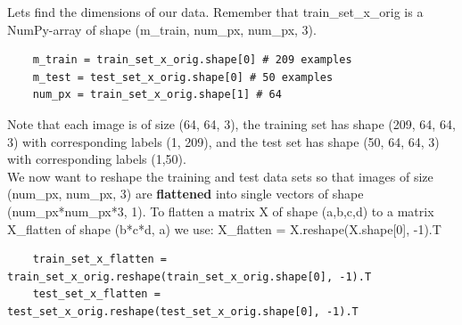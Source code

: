 \documentclass[11pt, a4paper]{article}
\begin{document}
\begin{spacing}{1.1}
	\noindent Lets find the dimensions of our data. Remember that train\_set\_x\_orig is a NumPy-array of shape (m\_train, num\_px, num\_px, 3). 
	\begin{lstlisting}
	m_train = train_set_x_orig.shape[0] # 209 examples
	m_test = test_set_x_orig.shape[0] # 50 examples
	num_px = train_set_x_orig.shape[1] # 64 \end{lstlisting} \vspace*{1mm} 
	Note that each image is of size (64, 64, 3), the training set has shape (209, 64, 64, 3) with corresponding labels (1, 209), and the test set has shape (50, 64, 64, 3) with corresponding labels (1,50). \vspace*{2mm} \\
	We now want to reshape the training and test data sets so that images of size (num\_px, num\_px, 3) are \textbf{flattened} into single vectors of shape (num\_px*num\_px*3, 1). To flatten a matrix X of shape (a,b,c,d) to a matrix X\_flatten of shape (b*c*d, a) we use: X\_flatten = X.reshape(X.shape[0], -1).T
	\begin{lstlisting}
	train_set_x_flatten = train_set_x_orig.reshape(train_set_x_orig.shape[0], -1).T
	test_set_x_flatten = test_set_x_orig.reshape(test_set_x_orig.shape[0], -1).T 
	

\end{lstlisting}
\end{spacing}
\end{document}
